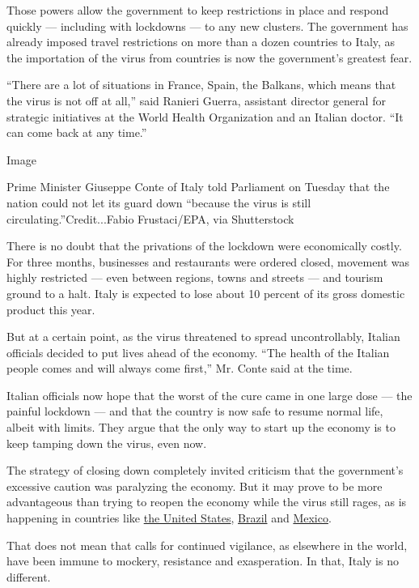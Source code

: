 Those powers allow the government to keep restrictions in place and
respond quickly --- including with lockdowns --- to any new clusters.
The government has already imposed travel restrictions on more than a
dozen countries to Italy, as the importation of the virus from countries
is now the government's greatest fear.

``There are a lot of situations in France, Spain, the Balkans, which
means that the virus is not off at all,'' said Ranieri Guerra, assistant
director general for strategic initiatives at the World Health
Organization and an Italian doctor. ``It can come back at any time.''

Image

Prime Minister Giuseppe Conte of Italy told Parliament on Tuesday that
the nation could not let its guard down ``because the virus is still
circulating.''Credit...Fabio Frustaci/EPA, via Shutterstock

There is no doubt that the privations of the lockdown were economically
costly. For three months, businesses and restaurants were ordered
closed, movement was highly restricted --- even between regions, towns
and streets --- and tourism ground to a halt. Italy is expected to lose
about 10 percent of its gross domestic product this year.

But at a certain point, as the virus threatened to spread
uncontrollably, Italian officials decided to put lives ahead of the
economy. ``The health of the Italian people comes and will always come
first,'' Mr. Conte said at the time.

Italian officials now hope that the worst of the cure came in one large
dose --- the painful lockdown --- and that the country is now safe to
resume normal life, albeit with limits. They argue that the only way to
start up the economy is to keep tamping down the virus, even now.

The strategy of closing down completely invited criticism that the
government's excessive caution was paralyzing the economy. But it may
prove to be more advantageous than trying to reopen the economy while
the virus still rages, as is happening in countries like
\href{https://www.nytimes3xbfgragh.onion/2020/03/13/us/coronavirus-deaths-estimate.html}{the
United States},
\href{https://www.nytimes3xbfgragh.onion/article/brazil-coronavirus-cases.html}{Brazil}
and
\href{https://www.nytimes3xbfgragh.onion/2020/06/05/world/americas/coronavirus-mexico-reopening.html}{Mexico}.

That does not mean that calls for continued vigilance, as elsewhere in
the world, have been immune to mockery, resistance and exasperation. In
that, Italy is no different.


